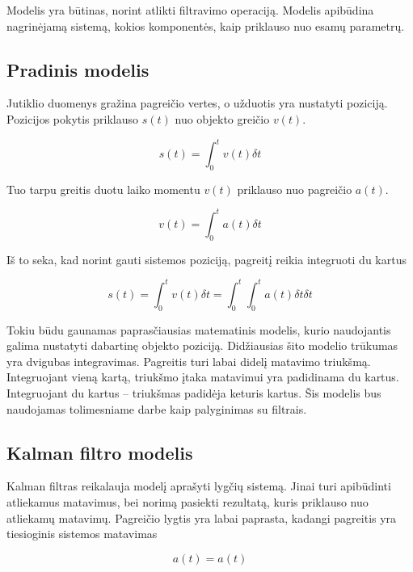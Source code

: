 Modelis yra būtinas, norint atlikti filtravimo operaciją.
Modelis apibūdina nagrinėjamą sistemą, kokios komponentės, kaip priklauso nuo esamų parametrų.

\subsection{Pradinis modelis}

Jutiklio duomenys gražina pagreičio vertes, o užduotis yra nustatyti poziciją. 
Pozicijos pokytis priklauso $s(t)$ nuo objekto greičio $v(t)$.

\begin{equation}
    s(t) = \int_0^tv(t) \delta t
\end{equation}

Tuo tarpu greitis duotu laiko momentu $v(t)$ priklauso nuo pagreičio $a(t)$.

\begin{equation}
    v(t) = \int_0^t a(t) \delta t
\end{equation}

Iš to seka, kad norint gauti sistemos poziciją, pagreitį reikia integruoti du kartus

\begin{equation}
    s(t) = \int_0^tv(t) \delta t = \int_0^t \int_0^t a(t) \delta t \delta t
\end{equation}

Tokiu būdu gaunamas paprasčiausias matematinis modelis, kurio naudojantis galima nustatyti dabartinę objekto poziciją.
Didžiausias šito modelio trūkumas yra dvigubas integravimas.
Pagreitis turi labai didelį matavimo triukšmą.
Integruojant vieną kartą, triukšmo įtaka matavimui yra padidinama du kartus.
Integruojant du kartus -- triukšmas padidėja keturis kartus. 
Šis modelis bus naudojamas tolimesniame darbe kaip palyginimas su filtrais.

\subsection{Kalman filtro modelis}

Kalman filtras reikalauja modelį aprašyti lygčių sistemą.
Jinai turi apibūdinti atliekamus matavimus, bei norimą pasiekti rezultatą, kuris priklauso nuo atliekamų matavimų.
Pagreičio lygtis yra labai paprasta, kadangi pagreitis yra tiesioginis sistemos matavimas

\begin{equation}
    a(t) = a(t)
\end{equation}

